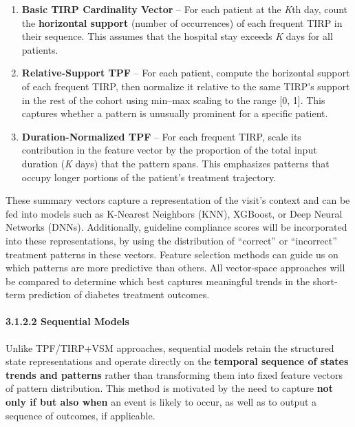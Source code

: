 \documentclass[
]{article}
\begin{document}
\begin{enumerate}
\def\labelenumi{\arabic{enumi}.}
\item
  \textbf{Basic TIRP Cardinality Vector} -- For each patient at the
  \emph{K}th day, count the \textbf{horizontal support} (number of
  occurrences) of each frequent TIRP in their sequence. This assumes
  that the hospital stay exceeds \emph{K} days for all patients.
\item
  \textbf{Relative-Support TPF} -- For each patient, compute the
  horizontal support of each frequent TIRP, then normalize it relative
  to the same TIRP's support in the rest of the cohort using min--max
  scaling to the range {[}0, 1{]}. This captures whether a pattern is
  unusually prominent for a specific patient.
\item
  \textbf{Duration-Normalized TPF} -- For each frequent TIRP, scale its
  contribution in the feature vector by the proportion of the total
  input duration (\emph{K} days) that the pattern spans. This emphasizes
  patterns that occupy longer portions of the patient's treatment
  trajectory.
\end{enumerate}

These summary vectors capture a representation of the visit's context
and can be fed into models such as K-Nearest Neighbors (KNN), XGBoost,
or Deep Neural Networks (DNNs). Additionally, guideline compliance
scores will be incorporated into these representations, by using the
distribution of ``correct'' or ``incorrect'' treatment patterns in these
vectors. Feature selection methods can guide us on which patterns are
more predictive than others. All vector-space approaches will be
compared to determine which best captures meaningful trends in the
short-term prediction of diabetes treatment outcomes.

\paragraph{3.1.2.2 Sequential Models}\label{sequential-models}

Unlike TPF/TIRP+VSM approaches, sequential models retain the structured
state representations and operate directly on the \textbf{temporal
sequence of states trends and patterns} rather than transforming them
into fixed feature vectors of pattern distribution. This method is
motivated by the need to capture \textbf{not only if but also when} an
event is likely to occur, as well as to output a sequence of outcomes,
if applicable.
\end{document}
